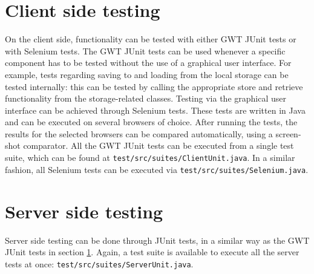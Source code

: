 \section{Client side testing}\label{sec:clientProc}
On the client side, functionality can be tested with either GWT JUnit tests or with Selenium tests. The GWT JUnit tests can be used whenever a specific component has to be tested without the use of a graphical user interface. For example, tests regarding saving to and loading from the local storage can be tested internally: this can be tested by calling the appropriate store and retrieve functionality from the storage-related classes. Testing via the graphical user interface can be achieved through Selenium tests. These tests are written in Java and can be executed on several browsers of choice. After running the tests, the results for the selected browsers can be compared automatically, using a screen-shot comparator.
All the GWT JUnit tests can be executed from a single test suite, which can be found at \texttt{test/src/suites/ClientUnit.java}. In a similar fashion, all Selenium tests can be executed via \texttt{test/src/suites/Selenium.java}.

\section{Server side testing}\label{sec:serverProc}
Server side testing can be done through JUnit tests, in a similar way as the GWT JUnit tests in section \ref{sec:clientProc}. Again, a test suite is available to execute all the server tests at once: \texttt{test/src/suites/ServerUnit.java}.

